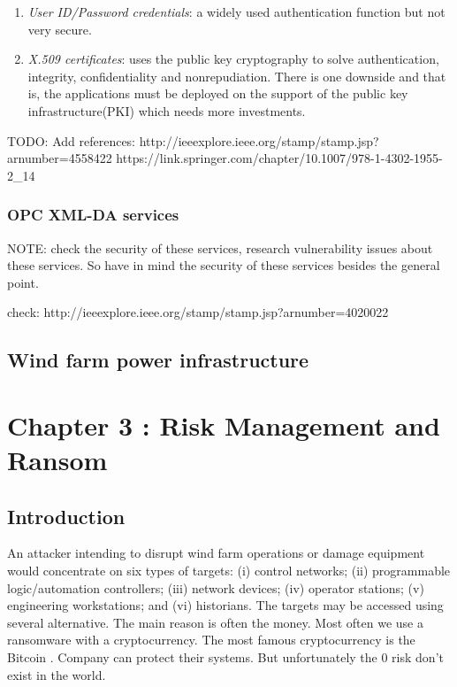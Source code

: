 \documentclass[twosided,a4,10pt]{article}
\begin{document}
\begin{multicols}{2}
  	\begin{enumerate}
  		\item \textit{User ID/Password credentials}: a widely used authentication function but not very secure.
  		\item \textit{X.509 certificates}: uses the public key cryptography to solve authentication, integrity, confidentiality and nonrepudiation. There is one downside and that is, the applications must be deployed on the support of the public key infrastructure(PKI) which needs more investments. 
  	\end{enumerate}
  	TODO: Add references: 
  	http://ieeexplore.ieee.org/stamp/stamp.jsp?arnumber=4558422
  	https://link.springer.com/chapter/10.1007/978-1-4302-1955-2_14
  \subsubsection{OPC XML-DA services}	
   	NOTE: check the security of these services, research vulnerability issues about these services. So have in mind the security of these services besides the general point.
   	
   	check: http://ieeexplore.ieee.org/stamp/stamp.jsp?arnumber=4020022
 \subsection{Wind farm power infrastructure}
  \lipsum[1]

\section{Chapter 3 : Risk Management and Ransom } 
\subsection{Introduction}
An attacker intending to disrupt wind farm operations or damage equipment would concentrate on six types of targets: (i) control networks; (ii) programmable logic/automation controllers; (iii) network devices; (iv) operator stations; (v) engineering workstations; and (vi) historians. The targets may be accessed using several alternative. The main reason is often the money. Most often we use a ransomware with a cryptocurrency. The most famous cryptocurrency is the Bitcoin . Company can protect their systems. But unfortunately the 0 risk don't exist in the world.


\end{multicols}
\end{document}
